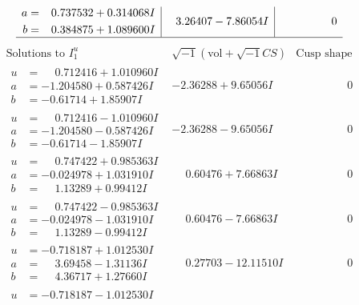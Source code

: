 \documentclass[1p]{elsarticle_modified}
\theoremstyle{definition}
\newcommand{\I}{\sqrt{-1}}
\begin{document}
$$\begin{array}{c|c|c}
\begin{aligned}
a &= \phantom{-}0.737532 + 0.314068 I \\
b &= \phantom{-}0.384875 + 1.089600 I\end{aligned}
 & \phantom{-}3.26407 - 7.86054 I & \phantom{-0.000000 } 0\\
 \hline 
 \end{array}$$\newpage$$\begin{array}{c|c|c}  
\text{Solutions to }I^u_{1}& \I (\text{vol} + \sqrt{-1}CS) & \text{Cusp shape}\\
 \hline 
\begin{aligned}
u &= \phantom{-}0.712416 + 1.010960 I \\
a &= -1.204580 + 0.587426 I \\
b &= -0.61714 + 1.85907 I\end{aligned}
 & -2.36288 + 9.65056 I & \phantom{-0.000000 } 0 \\ \hline\begin{aligned}
u &= \phantom{-}0.712416 - 1.010960 I \\
a &= -1.204580 - 0.587426 I \\
b &= -0.61714 - 1.85907 I\end{aligned}
 & -2.36288 - 9.65056 I & \phantom{-0.000000 } 0 \\ \hline\begin{aligned}
u &= \phantom{-}0.747422 + 0.985363 I \\
a &= -0.024978 + 1.031910 I \\
b &= \phantom{-}1.13289 + 0.99412 I\end{aligned}
 & \phantom{-}0.60476 + 7.66863 I & \phantom{-0.000000 } 0 \\ \hline\begin{aligned}
u &= \phantom{-}0.747422 - 0.985363 I \\
a &= -0.024978 - 1.031910 I \\
b &= \phantom{-}1.13289 - 0.99412 I\end{aligned}
 & \phantom{-}0.60476 - 7.66863 I & \phantom{-0.000000 } 0 \\ \hline\begin{aligned}
u &= -0.718187 + 1.012530 I \\
a &= \phantom{-}3.69458 - 1.31136 I \\
b &= \phantom{-}4.36717 + 1.27660 I\end{aligned}
 & \phantom{-}0.27703 - 12.11510 I & \phantom{-0.000000 } 0 \\ \hline\begin{aligned}
u &= -0.718187 - 1.012530 I \\

\end{aligned}
\end{array}$$
\end{document}
